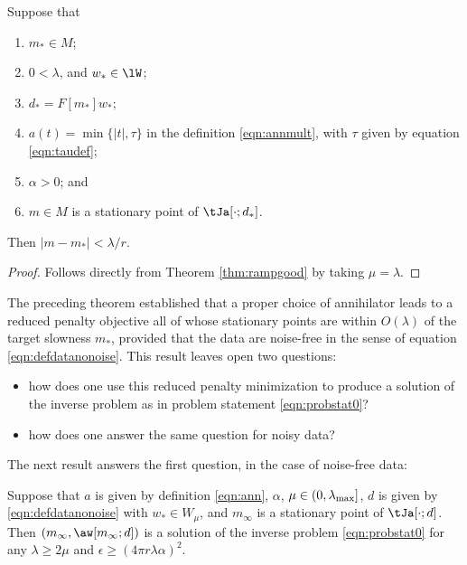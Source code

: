 \begin{corollary}
  \label{thm:rampreallygood}
  Suppose that
  \begin{enumerate}
  \item $m_* \in M$;
  \item $0 <  \lambda$, and $w_* \in \lW$;
  \item $d_* = F[m_*]w_*$;
  \item $a(t)=\min\{|t|,\tau\}$ in the definition \ref{eqn:annmult},
    with $\tau$ given by equation \ref{eqn:taudef}; 
  \item $\alpha > 0$; and
  \item$m \in M$ is a stationary point of $\tJa[\cdot;d_*]$.
  \end{enumerate}
  Then $|m-m_*| < \lambda /r$.
\end{corollary}

\begin{proof} Follows directly from Theorem \ref{thm:rampgood} by
  taking $\mu=\lambda$.
\end{proof}

The preceding theorem established that a proper choice of annihilator
leads to a reduced penalty objective all of whose stationary points
are within $O(\lambda)$ of the target slowness $m_*$, provided that
the data are noise-free in the sense of equation
\ref{eqn:defdatanonoise}. This result leaves open two questions:
\begin{itemize}
\item how does one use this reduced penalty minimization to produce
  a solution of the inverse problem as in problem statement
  \ref{eqn:probstat0}? 
\item how does one answer the same question for noisy data?
\end{itemize}

The next result answers the first question, in the case of noise-free data:
\begin{proposition}
  \label{thm:ipnonoisesuf}
  Suppose that $a$ is given by definition \ref{eqn:ann}, $\alpha$,
  $\mu \in (0,\lambda_{\rm max}]$,
  $d$ is given by
  \ref{eqn:defdatanonoise} with $w_* \in W_{\mu}$, and  $m_{\infty}$ is a stationary
  point of $\tJa[\cdot;d]$. Then $(m_{\infty},\aw[m_{\infty};d])$ is a
  solution of the inverse problem \ref{eqn:probstat0} for any $\lambda
  \ge 2\mu$ and $\epsilon \ge (4\pi r \lambda \alpha)^2$.
\end{proposition}

